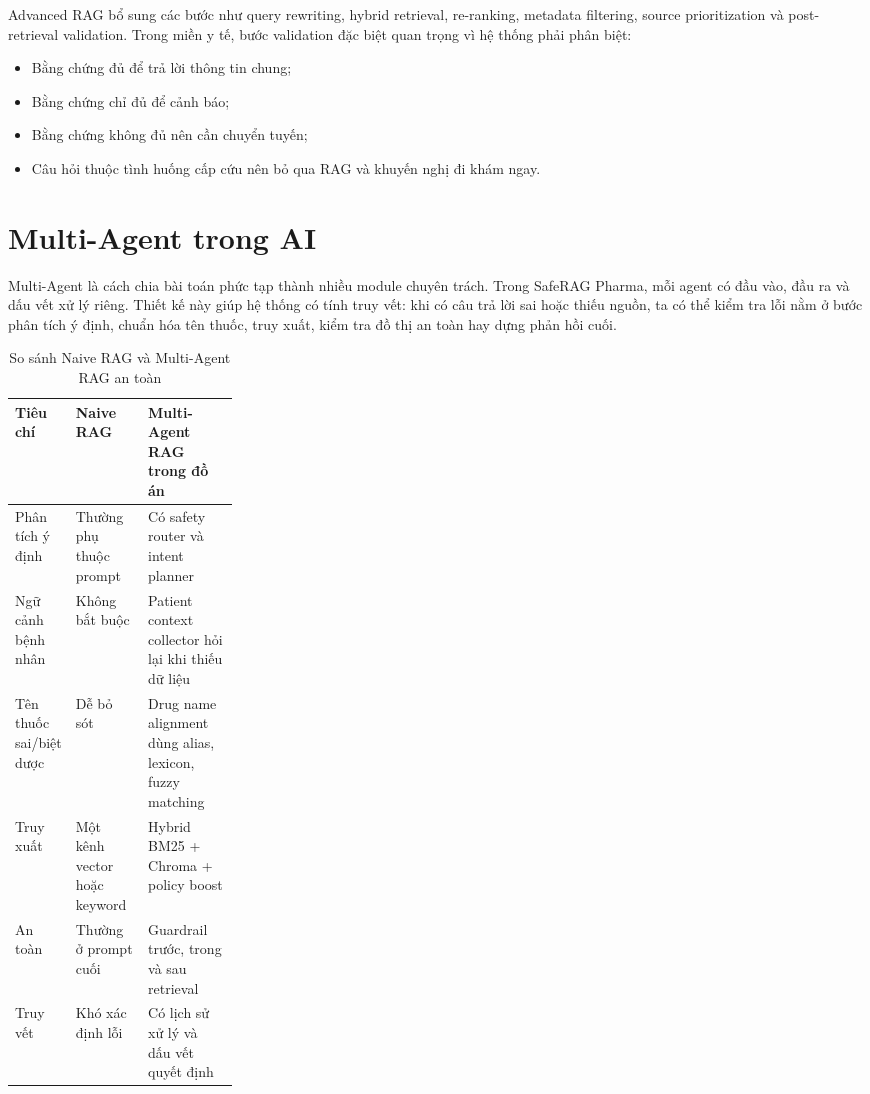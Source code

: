 Advanced RAG bổ sung các bước như query rewriting, hybrid retrieval, re-ranking, metadata filtering, source prioritization và post-retrieval validation. Trong miền y tế, bước validation đặc biệt quan trọng vì hệ thống phải phân biệt:

\begin{itemize}
  \item Bằng chứng đủ để trả lời thông tin chung;
  \item Bằng chứng chỉ đủ để cảnh báo;
  \item Bằng chứng không đủ nên cần chuyển tuyến;
  \item Câu hỏi thuộc tình huống cấp cứu nên bỏ qua RAG và khuyến nghị đi khám ngay.
\end{itemize}

\section{Multi-Agent trong AI}

Multi-Agent là cách chia bài toán phức tạp thành nhiều module chuyên trách. Trong SafeRAG Pharma, mỗi agent có đầu vào, đầu ra và dấu vết xử lý riêng. Thiết kế này giúp hệ thống có tính truy vết: khi có câu trả lời sai hoặc thiếu nguồn, ta có thể kiểm tra lỗi nằm ở bước phân tích ý định, chuẩn hóa tên thuốc, truy xuất, kiểm tra đồ thị an toàn hay dựng phản hồi cuối.

\begin{table}[H]
\centering
\small
\caption{So sánh Naive RAG và Multi-Agent RAG an toàn}
\begin{tabularx}{\linewidth}{p{0.26\linewidth} Y Y}
\toprule
\textbf{Tiêu chí} & \textbf{Naive RAG} & \textbf{Multi-Agent RAG trong đồ án} \\
\midrule
Phân tích ý định & Thường phụ thuộc prompt & Có safety router và intent planner \\
Ngữ cảnh bệnh nhân & Không bắt buộc & Patient context collector hỏi lại khi thiếu dữ liệu \\
Tên thuốc sai/biệt dược & Dễ bỏ sót & Drug name alignment dùng alias, lexicon, fuzzy matching \\
Truy xuất & Một kênh vector hoặc keyword & Hybrid BM25 + Chroma + policy boost \\
An toàn & Thường ở prompt cuối & Guardrail trước, trong và sau retrieval \\
Truy vết & Khó xác định lỗi & Có lịch sử xử lý và dấu vết quyết định \\
\bottomrule
\end{tabularx}
\end{table}

